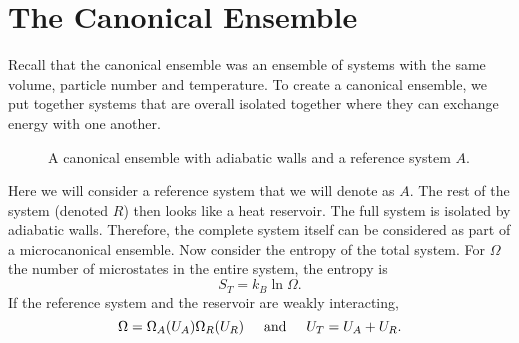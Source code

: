 \chapter{The Canonical Ensemble}
Recall that the canonical ensemble was an ensemble of systems with the same volume, particle number and temperature. To create a canonical ensemble, we put together systems that are overall isolated together where they can exchange energy with one another. 
\begin{figure}[h!]
    \centering
{}
    \caption{A canonical ensemble with adiabatic walls and a reference system $A$.}
    \label{fig:canonical_ensemble}
\end{figure}
Here we will consider a reference system that we will denote as $A$. The rest of the system (denoted $R$) then looks like a heat reservoir. The full system is isolated by adiabatic walls. Therefore, the complete system itself can be considered as part of a microcanonical ensemble. Now consider the entropy of the total system. For $\Omega$ the number of microstates in the entire system, the entropy is
\begin{equation}
    S_T = k_B\ln\Omega.
\end{equation}
If the reference system and the reservoir are weakly interacting, 
\begin{equation}
    \Omega = \Omega_A(U_A)\Omega_R(U_R) \hspace{0.5cm}\textrm{and}\hspace{0.5cm}    U_T=U_A+U_R.
\end{equation}

